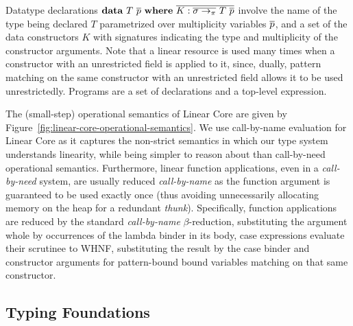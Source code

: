\documentclass[acmsmall,review]{acmart}
\begin{document}
Datatype declarations $\mathbf{data}~T~\overline{p}~\mathbf{where}~\overline{K:\overline{\sigma
\to_\pi}~T~\overline{p} }$ involve the name of the type being declared $T$
parametrized over multiplicity variables $\overline{p}$, and a set of the data
constructors $K$ with signatures indicating the type and multiplicity of the
constructor arguments. Note that a linear resource is used many times when a
constructor with an unrestricted field is applied to it, since, dually, pattern
matching on the same constructor with an unrestricted field allows it to be
used unrestrictedly. Programs are a set of declarations and a top-level
expression.

\SyntaxFull


The (small-step) operational semantics of Linear Core are given by
Figure~\ref{fig:linear-core-operational-semantics}. We use call-by-name
evaluation for Linear Core as it captures the non-strict semantics in which
our type system understands linearity, while being simpler to reason about than
call-by-need operational semantics.
Furthermore, linear function applications, even in a \emph{call-by-need} system, are
usually reduced \emph{call-by-name} as the function argument is guaranteed to
be used exactly once (thus avoiding unnecessarily allocating memory on the heap
for a redundant \emph{thunk}).
%
Specifically, function applications are reduced by the standard
\emph{call-by-name} $\beta$-reduction, substituting the argument whole by
occurrences of the lambda binder in its body, case expressions evaluate their
scrutinee to WHNF, substituting the result by the case binder and constructor
arguments for pattern-bound bound variables matching on that same constructor.



\subsection{Typing Foundations\label{sec:base-calculi}}
\end{document}
